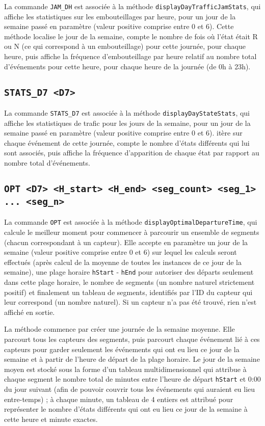 \documentclass[11pt,a4paper]{article}
\begin{document}
La commande \texttt{JAM\_DH} est associée à la méthode \texttt{displayDayTrafficJamStats}, qui affiche les statistiques sur les embouteillages par heure, pour un jour de la semaine passé en paramètre (valeur positive comprise entre 0 et 6). Cette méthode localise le jour de la semaine, compte le nombre de fois où l'état était R ou N (ce qui correspond à un embouteillage) pour cette journée, pour chaque heure, puis affiche la fréquence d'embouteillage par heure relatif au nombre total d'événements pour cette heure, pour chaque heure de la journée (de 0h à 23h).

\subsection{\texttt{STATS\_D7 <D7>}}
\label{subsec:STATS_D7}

La commande \texttt{STATS\_D7} est associée à la méthode \texttt{displayDayStateStats}, qui affiche les statistiques de trafic pour les jours de la semaine, pour un jour de la semaine passé en paramètre (valeur positive comprise entre 0 et 6). itère sur chaque événement de cette journée, compte le nombre d'états différents qui lui sont associés, puis affiche la fréquence d'apparition de chaque état par rapport au nombre total d'événements.

\subsection{\texttt{OPT <D7> <H\_start> <H\_end> <seg\_count> <seg\_1> ... <seg\_n>}}
\label{subsec:OPT}

La commande \texttt{OPT} est associée à la méthode \texttt{displayOptimalDepartureTime}, qui calcule le meilleur moment pour commencer à parcourir un ensemble de segments (chacun correspondant à un capteur). Elle accepte en paramètre un jour de la semaine (valeur positive comprise entre 0 et 6) sur lequel les calculs seront effectués (après calcul de la moyenne de toutes les instances de ce jour de la semaine),  une plage horaire \texttt{hStart} - \texttt{hEnd} pour autoriser des départs seulement dans cette plage horaire, le nombre de segments (un nombre naturel strictement positif) et finalement un tableau de segments, identifiés par l'ID du capteur qui leur correspond (un nombre naturel). Si un capteur n'a pas été trouvé, rien n'est affiché en sortie.

La méthode commence par créer une journée de la semaine moyenne. Elle parcourt tous les capteurs des segments, puis parcourt chaque événement lié à ces capteurs pour garder seulement les événements qui ont eu lieu ce jour de la semaine et à partir de l'heure de départ de la plage horaire. Le jour de la semaine moyen est stocké sous la forme d'un tableau multidimensionnel qui attribue à chaque segment le nombre total de minutes entre l'heure de départ \texttt{hStart} et 0:00 du jour suivant (afin de pouvoir couvrir tous les événements qui auraient eu lieu entre-temps) ; à chaque minute, un tableau de 4 entiers est attribué pour représenter le nombre d'états différents qui ont eu lieu ce jour de la semaine à cette heure et minute exactes.
\end{document}
